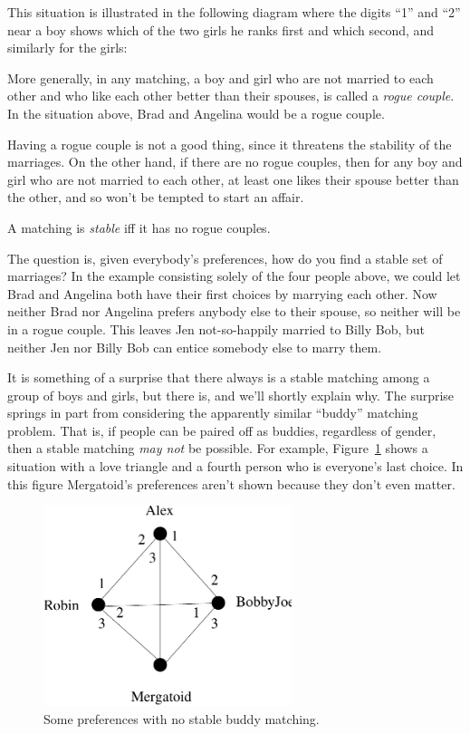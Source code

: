 This situation is illustrated in the following diagram where the digits
``1'' and ``2'' near a boy shows which of the two girls he ranks first and
which second, and similarly for the girls:


More generally, in any matching, a boy and girl who are not married to
each other and who like each other better than their spouses, is called a
{\em rogue couple}.  In the situation above, Brad and Angelina would be a
rogue couple.

Having a rogue couple is not a good thing, since it threatens the
stability of the marriages.  On the other hand, if there are no rogue
couples, then for any boy and girl who are not married to each other, at
least one likes their spouse better than the other, and so won't be
tempted to start an affair.

\begin{definition}
A matching is {\em stable} iff it has no rogue couples.
\end{definition}
 
The question is, given everybody's preferences, how do you find a stable
set of marriages?  In the example consisting solely of the four people
above, we could let Brad and Angelina both have their first choices by
marrying each other.  Now neither Brad nor Angelina prefers anybody else
to their spouse, so neither will be in a rogue couple.  This leaves Jen
not-so-happily married to Billy Bob, but neither Jen nor Billy Bob can
entice somebody else to marry them.
 
It is something of a surprise that there always is a stable matching among
a group of boys and girls, but there is, and we'll shortly explain why.
The surprise springs in part from considering the apparently similar
``buddy'' matching problem.  That is, if people can be paired off as
buddies, regardless of gender, then a stable matching \emph{may not} be
possible.  For example, Figure~\ref{fig:buddy} shows a situation with a
love triangle and a fourth person who is everyone's last choice.  In this
figure Mergatoid's preferences aren't shown because they don't even
matter.   

\begin{figure}[htbp]
\centering \includegraphics[height=2.3in]{figures/loveTriangle.pdf}
\caption{Some preferences with no stable buddy matching.}
\label{fig:buddy}
\end{figure}
 
